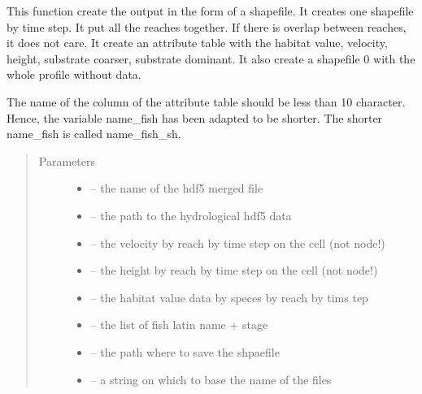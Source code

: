 \documentclass[letterpaper,10pt,english]{sphinxmanual}
\begin{document}
\begin{fulllineitems}
\label{\detokenize{index:src.calcul_hab.save_hab_shape}}
This function create the output in the form of a shapefile. It creates one shapefile by time step. It put
all the reaches together. If there is overlap between reaches, it does not care. It create an attribute table
with the habitat value, velocity, height, substrate coarser, substrate dominant. It also create a shapefile
0 with the whole profile without data.

The name of the column of the attribute table should be less than 10 character. Hence, the variable name\_fish
has been adapted to be shorter. The shorter name\_fish is called name\_fish\_sh.
\begin{quote}\begin{description}
\item[{Parameters}] \leavevmode\begin{itemize}
\item {} 
 -- the name of the hdf5 merged file

\item {} 
 -- the path to the hydrological hdf5 data

\item {} 
 -- the velocity by reach by time step on the cell (not node!)

\item {} 
 -- the height by reach by time step on the cell (not node!)

\item {} 
 -- the habitat value data by speces by reach by tims tep

\item {} 
 -- the list of fish latin name + stage

\item {} 
 -- the path where to save the shpaefile

\item {} 
 -- a string on which to base the name of the files

\end{itemize}

\end{description}\end{quote}

\end{fulllineitems}
\end{document}
